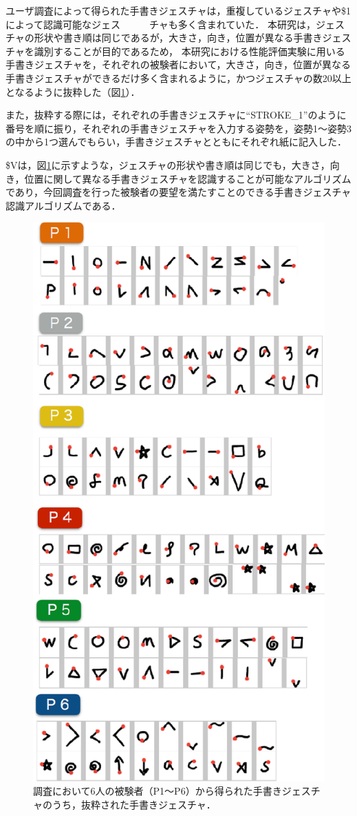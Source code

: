 ユーザ調査によって得られた手書きジェスチャは，重複しているジェスチャや\$1によって認識可能なジェス　　　チャも多く含まれていた．
本研究は，ジェスチャの形状や書き順は同じであるが，大きさ，向き，位置が異なる手書きジェスチャを識別することが目的であるため，
本研究における性能評価実験に用いる手書きジェスチャを，それぞれの被験者において，大きさ，向き，位置が異なる手書きジェスチャができるだけ多く含まれるように，かつジェスチャの数20以上となるように抜粋した（図\ref{fig:elicetated_strokes}）．

また，抜粋する際には，それぞれの手書きジェスチャに``STROKE\_1''のように番号を順に振り，それぞれの手書きジェスチャを入力する姿勢を，姿勢1〜姿勢3の中から1つ選んでもらい，手書きジェスチャとともにそれぞれ紙に記入した．

\$Vは，図\ref{fig:elicetated_strokes}に示すような，ジェスチャの形状や書き順は同じでも，大きさ，向き，位置に関して異なる手書きジェスチャを認識することが可能なアルゴリズムであり，今回調査を行った被験者の要望を満たすことのできる手書きジェスチャ認識アルゴリズムである．

\begin{figure} [t]
 \begin{center}
  \includegraphics [width=0.65\columnwidth]{img/elicitated_strokes.eps}
  \caption{調査において6人の被験者（P1〜P6）から得られた手書きジェスチャのうち，抜粋された手書きジェスチャ．}
  \label{fig:elicetated_strokes}
 \end{center}
\end{figure}






